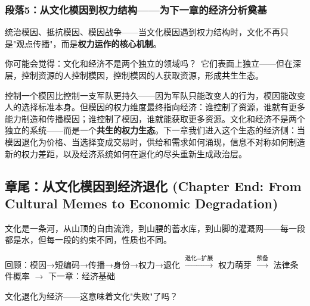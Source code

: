 \documentclass[../main.tex]{subfiles}
\begin{document}
	\subsubsection*{段落5：从文化模因到权力结构——为下一章的经济分析奠基}

	统治模因、抵抗模因、模因战争——当文化模因遇到权力结构时，文化不再只是"观点传播"，而是\textbf{权力运作的核心机制}。

	\begin{tcolorbox}[colback=yellow!5, title=\textit{读者行为预测}]

		你可能会觉得：文化和经济不是两个独立的领域吗？\ 它们表面上独立——但在深层，控制资源的人控制模因，控制模因的人获取资源，形成共生生态。

	\end{tcolorbox}

控制一个模因比控制一支军队更持久——因为军队只能改变人的行为，模因能改变人的选择标准本身。但模因的权力维度最终指向经济：谁控制了资源，谁就有更多能力制造和传播模因；谁控制了模因，谁就能获取更多资源。文化和经济不是两个独立的系统——而是一个\textbf{共生的权力生态}。下一章我们进入这个生态的经济侧：当模因退化为价格、当选择变成交易时，供给和需求如何涌现，信息不对称如何制造新的权力差距，以及经济系统如何在退化的尽头重新生成政治层。

	\subsection{章尾：从文化模因到经济退化 (Chapter End: From Cultural Memes to Economic Degradation)}

	\begin{motivation}

		文化是一条河，从山顶的自由流淌，到山腰的蓄水库，到山脚的灌溉网——每一段都是水，但每一段的约束不同，性质也不同。

	\end{motivation}

	\begin{logicmap}

		回顾：模因→短编码→传播→身份→权力→退化 $\xrightarrow{\text{退化=扩展}}$ 权力萌芽 $\xrightarrow{\text{预备}}$ 法律条件概率 $\rightarrow$ 下一章：经济基础

	\end{logicmap}

	\begin{questionbox}

		文化退化为经济——这意味着文化"失败"了吗？

	\end{questionbox}
\end{document}
